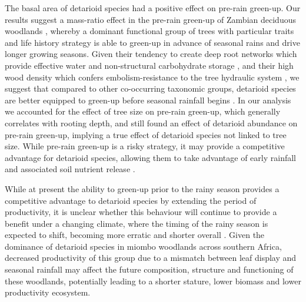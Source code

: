 \documentclass[11pt,a4paper]{article}
\begin{document}
The basal area of detarioid species had a positive effect on pre-rain green-up.
Our results suggest a mass-ratio effect in the pre-rain green-up of Zambian
deciduous woodlands \citep{Grime1998}, whereby a dominant functional group of
trees with particular traits and life history strategy is able to green-up in
advance of seasonal rains and drive longer growing seasons. Given their
tendency to create deep root networks which provide effective water and
non-structural carbohydrate storage \citep{Zhou2020, Timberlake1993}, and their
high wood density which confers embolism-resistance to the tree hydraulic
system \citep{Hoffmann2011, Hacke2001, Chave2009}, we suggest that compared to
other co-occurring taxonomic groups, detarioid species are better equipped to
green-up before seasonal rainfall begins \citep{Vinya2018}. In our analysis we
accounted for the effect of tree size on pre-rain green-up, which generally
correlates with rooting depth, and still found an effect of detarioid abundance
on pre-rain green-up, implying a true effect of detarioid species not linked to
tree size. While pre-rain green-up is a risky strategy, it may provide a
competitive advantage for detarioid species, allowing them to take advantage of
early rainfall and associated soil nutrient release \citep{February2016}.

While at present the ability to green-up prior to the rainy season provides a
competitive advantage to detarioid species by extending the period of
productivity, it is unclear whether this behaviour will continue to provide a
benefit under a changing climate, where the timing of the rainy season is
expected to shift, becoming more erratic and shorter overall
\citep{Shongwe2011, Pohl2017, Wainwright2021}. Given the dominance of detarioid
species in miombo woodlands across southern Africa, decreased productivity of
this group due to a mismatch between leaf display and seasonal rainfall may
affect the future composition, structure and functioning of these woodlands,
potentially leading to a shorter stature, lower biomass and lower productivity
ecosystem.
\end{document}

